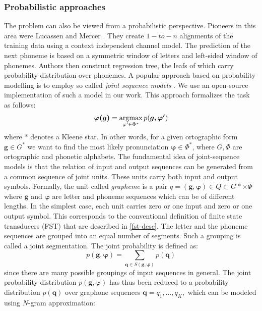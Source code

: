 \subsubsection{Probabilistic approaches}
The problem can also be viewed from a probabilistic perspective.
Pioneers in this area were Lucassen and Mercer \cite{lucassen1984information}.
They create $1-to-n$ alignments of the training data using a context independent channel model.
The prediction of the next phoneme is based on a symmetric window of letters and left-sided window of phonemes.
Authors then construct regression tree, the leafs of which carry probability distribution over phonemes.
\linebreak\linebreak
\label{g2p-jseq}
A popular approach based on probability modelling is to employ so called \textit{joint sequence models} \cite{bisani2008joint}.
We use an open-source implementation of such a model in our work.
This approach formalizes the task as follows:
\begin{equation}
\boldsymbol{\varphi(g)} = \operatorname*{argmax}_{\varphi'\in\Phi^*} p(\boldsymbol{g,\varphi'})
\end{equation}
where * denotes a Kleene star.
In other words, for a given ortographic form $\boldsymbol{g} \in G^*$ we want to find the most likely pronunciation $\boldsymbol{\varphi} \in \Phi^*$, where $G, \Phi$ are ortographic and phonetic alphabets.
The fundamental idea of joint-sequence models is that the relation of input and output sequences can be generated from a common sequence of joint units.
These units carry both input and output symbols.
Formally, the unit called \textit{grapheme} is a pair $q = (\mathbf{g}, \mathbf{\varphi}) \in Q \subset G* \times \Phi$ where $\mathbf{g}$ and $\mathbf{\varphi}$ are letter and phoneme sequences which can be of different lengths.
In the simplest case, each unit carries zero or one input and zero or one output symbol.
This corresponds to the conventional definition of finite state transducers (FST) that are described in \ref{fst-desc}.
The letter and the phoneme sequences are grouped into an equal number of segments.
Such a grouping is called a joint segmentation.
The joint probability is defined as:
\begin{equation}
p(\mathbf{g}, \mathbf{\varphi}) = \sum_{\mathbf{q}\in S(\mathbf{g},\mathbf{\varphi})}p(\mathbf{q})
\end{equation}
since there are many possible groupings of input sequences in general.
The joint probability distribution $p(\mathbf{g}, \mathbf{\varphi})$ has thus been reduced to a probability distribution $p(\mathbf{q})$ over graphone sequences $\mathbf{q} = q_1, \dots, q_K,$ which can be modeled using  $N$-gram approximation:
